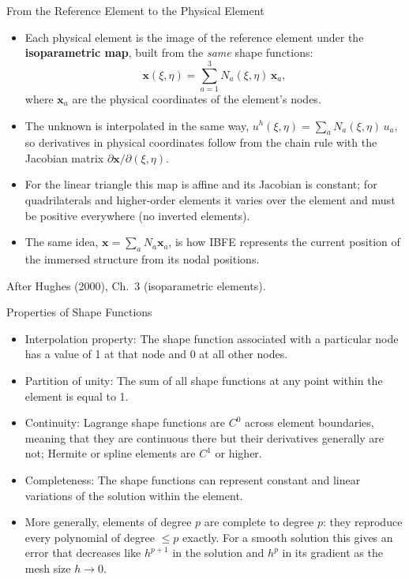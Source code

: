 \documentclass[aspectratio=169,11pt]{beamer}
\begin{document}
\begin{frame}{From the Reference Element to the Physical Element}
    \begin{itemize}
        \item Each physical element is the image of the reference element under the \textbf{isoparametric map}, built from the \emph{same} shape functions:
        \[
          \mathbf{x}(\xi,\eta) = \sum_{a=1}^{3} N_a(\xi,\eta)\,\mathbf{x}_a ,
        \]
        where $\mathbf{x}_a$ are the physical coordinates of the element's nodes.
        \item The unknown is interpolated in the same way, $u^h(\xi,\eta) = \sum_a N_a(\xi,\eta)\,u_a$, so derivatives in physical coordinates follow from the chain rule with the Jacobian matrix $\partial\mathbf{x}/\partial(\xi,\eta)$.
        \item For the linear triangle this map is affine and its Jacobian is constant; for quadrilaterals and higher-order elements it varies over the element and must be positive everywhere (no inverted elements).
        \item The same idea, $\mathbf{x}=\sum_a N_a\mathbf{x}_a$, is how IBFE represents the current position of the immersed structure from its nodal positions.
    \end{itemize}
    \vspace{1mm}
    {\tiny\color{DarkGray}After Hughes (2000), Ch.~3 (isoparametric elements).\par}
\end{frame}

\begin{frame}{Properties of Shape Functions}
    \begin{itemize}
        \item Interpolation property: The shape function associated with a particular node has a value of 1 at that node and 0 at all other nodes.
        \item Partition of unity: The sum of all shape functions at any point within the element is equal to 1.
        \item Continuity: Lagrange shape functions are $C^0$ across element boundaries, meaning that they are continuous there but their derivatives generally are not; Hermite or spline elements are $C^1$ or higher.
        \item Completeness: The shape functions can represent constant and linear variations of the solution within the element.
        \item More generally, elements of degree $p$ are complete to degree $p$: they reproduce every polynomial of degree $\le p$ exactly. For a smooth solution this gives an error that decreases like $h^{p+1}$ in the solution and $h^{p}$ in its gradient as the mesh size $h\to 0$.
    \end{itemize}
\end{frame}
\end{document}
